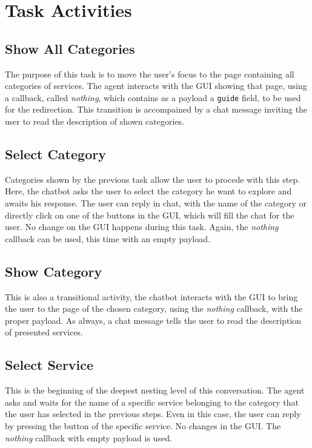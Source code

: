 \documentclass[12pt]{report}
\begin{document}
\section{Task Activities}

\subsection{Show All Categories}
The purpose of this task is to move the user's focus to the page containing 
all categories of services. 
The agent interacts with the GUI showing that page, using a callback,
called \emph{nothing}, which contains as a payload a \texttt{guide} field, to
be used for the redirection.
This transition is accompained by a chat message inviting the user to read 
the description of shown categories.

\subsection{Select Category}
Categories shown by the previous task allow the user to procede with this step.
Here, the chatbot asks the user to select the category he want to explore
and awaits his response.
The user can reply in chat, with the name of the category or directly click on one 
of the buttons in the GUI, which will fill the chat for the user.
No change on the GUI happens during this task. Again, the \emph{nothing} callback can 
be used, this time with an empty payload.

\subsection{Show Category}
This is also a transitional activity, the chatbot interacts with the GUI to 
bring the user to the page of the chosen category, using the \emph{nothing} callback, 
with the proper payload. As always, a chat message tells the user to read the description 
of presented services.

\subsection{Select Service}
This is the beginning of the deepest nesting level of this conversation.
The agent asks and waits for the name of a specific service belonging to the 
category that the user has selected in the previous steps.
Even in this case, the user can reply by pressing the button of the specific
service. No changes in the GUI. The \emph{nothing} callback with empty payload
is used.
\end{document}
